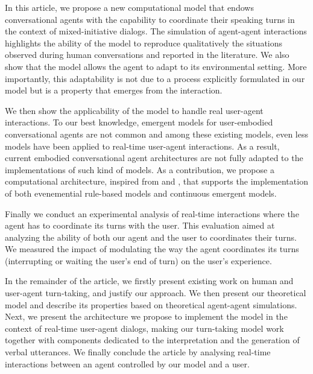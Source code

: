 In this article, we propose a new computational model that endows conversational agents with the capability to coordinate their speaking turns in the context of mixed-initiative dialogs. The simulation of agent-agent interactions highlights the ability of the model to reproduce qualitatively the situations observed during human conversations and reported in the literature. 
We also show that the model allows the agent to adapt to its environmental setting.
More importantly, this adaptability is not due to a process explicitly formulated in our model but is a property that emerges from the interaction. 

We then show the applicability of the model to handle real user-agent interactions. To our best knowledge, emergent models for user-embodied conversational agents are not common and among these existing models, even less models have been applied to real-time user-agent interactions. As a result, current embodied conversational agent architectures are not fully adapted to the implementations of such kind of models. 
As a contribution, we propose a computational architecture, inspired from \cite{kopp_architecture_2014} and \cite{thorisson_mind_1999}, that supports the implementation of both evenemential rule-based models and continuous emergent models. 

Finally we conduct an experimental analysis of real-time interactions where the agent has to coordinate its turns with the user. This evaluation aimed at analyzing the ability of both our agent and the user to coordinates their turns. 
We measured the impact of modulating the way the agent coordinates its turns (interrupting or waiting the user's end of turn) on the user's experience. 

In the remainder of the article, we firstly present existing work on human and user-agent turn-taking, and justify our approach. We then present our theoretical model and describe its properties based on theoretical agent-agent simulations.  Next, we present the architecture we propose to implement the model in the context of real-time user-agent dialogs, making our turn-taking model work together with components dedicated to the interpretation and the generation of verbal utterances. We finally conclude the article by analysing real-time interactions between an agent controlled by our model and a user. 
